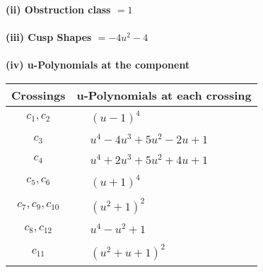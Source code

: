 \documentclass[1p]{elsarticle_modified}
\theoremstyle{definition}
\begin{document}
\flushleft \textbf{(ii) Obstruction class $= 1$}\\~\\
\flushleft \textbf{(iii) Cusp Shapes $= -4 u^2-4$}\\~\\
\newpage\renewcommand{\arraystretch}{1}
\flushleft \textbf{(iv) u-Polynomials at the component}\newline \\
\begin{tabular}{m{50pt}|m{274pt}}
Crossings & \hspace{64pt}u-Polynomials at each crossing \\
\hline $$\begin{aligned}c_{1},c_{2}\end{aligned}$$&$\begin{aligned}
&(u-1)^4
\end{aligned}$\\
\hline $$\begin{aligned}c_{3}\end{aligned}$$&$\begin{aligned}
&u^4-4 u^3+5 u^2-2 u+1
\end{aligned}$\\
\hline $$\begin{aligned}c_{4}\end{aligned}$$&$\begin{aligned}
&u^4+2 u^3+5 u^2+4 u+1
\end{aligned}$\\
\hline $$\begin{aligned}c_{5},c_{6}\end{aligned}$$&$\begin{aligned}
&(u+1)^4
\end{aligned}$\\
\hline $$\begin{aligned}c_{7},c_{9},c_{10}\end{aligned}$$&$\begin{aligned}
&(u^2+1)^2
\end{aligned}$\\
\hline $$\begin{aligned}c_{8},c_{12}\end{aligned}$$&$\begin{aligned}
&u^4- u^2+1
\end{aligned}$\\
\hline $$\begin{aligned}c_{11}\end{aligned}$$&$\begin{aligned}
&(u^2+u+1)^2
\end{aligned}$\\
\hline
\end{tabular}\\~\\
\end{document}
